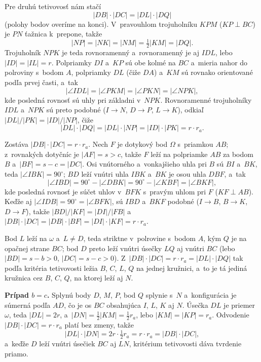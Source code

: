 {    Pre druhú tetivovosť nám stačí
    $$
    |DB| \cdot |DC| = |DL| \cdot |DQ|
    $$
    (polohy bodov overíme na konci). V~pravouhlom trojuholníku $KPM$ ($KP \perp BC$) je $PN$ ťažnica k~prepone, takže
    $$
    |NP| = |NK| = |NM| = \tfrac12|KM| = |DQ|.
    $$
    Trojuholník $NPK$ je teda rovnoramenný a~rovnoramenný je aj $IDL$, lebo $|ID| = |IL| = r$. Polpriamky $DI$ a~$KP$ sú obe kolmé na $BC$ a~mieria nahor do polroviny s~bodom $A$, polpriamky $DL$ (čiže $DA$) a~$KM$ sú rovnako orientované podľa prvej časti, a~tak
    $$
    |\angle IDL| = |\angle PKM| = |\angle PKN| = |\angle NPK|,
    $$
    kde posledná rovnosť sú uhly pri základni v~$NPK$. Rovnoramenné trojuholníky $IDL$ a~$NPK$ sú preto podobné ($I \to N$, $D \to P$, $L \to K$), odkiaľ $|DL|/|PK| = |ID|/|NP|$, čiže
    $$
    |DL| \cdot |DQ| = |DL| \cdot |NP| = |ID| \cdot |PK| = r \cdot r_a.
    $$

    Zostáva $|DB| \cdot |DC| = r \cdot r_a$. Nech $F$ je dotykový bod $\Omega$ s~priamkou $AB$; z~rovnakých dotyčníc je $|AF| = s > c$, takže $F$ leží na polpriamke $AB$ za bodom $B$ a~$|BF| = s-c = |DC|$. Osi vnútorného a~vonkajšieho uhla pri $B$ sú $BI$ a~$BK$, teda $|\angle IBK| = 90^\circ$; $BD$ leží vnútri uhla $IBK$ a~$BK$ je osou uhla $DBF$, a~tak
    $$
    |\angle IBD| = 90^\circ - |\angle DBK| = 90^\circ - |\angle KBF| = |\angle BKF|,
    $$
    kde posledná rovnosť je súčet uhlov v~$BFK$ s~pravým uhlom pri $F$ ($KF \perp AB$). Keďže aj $|\angle IDB| = 90^\circ = |\angle BFK|$, sú $IBD$ a~$BKF$ podobné ($I \to B$, $B \to K$, $D \to F$), takže $|BD|/|KF| = |DI|/|FB|$ a~$|DB| \cdot |DC| = |DB| \cdot |BF| = |DI| \cdot |KF| = r \cdot r_a$.

    Bod $L$ leží na $\omega$ a~$L \neq D$, teda striktne v~polrovine s~bodom $A$, kým $Q$ je na opačnej strane $BC$; bod $D$ preto leží vnútri úsečky $LQ$ aj vnútri $BC$ (lebo $|BD| = s-b > 0$, $|DC| = s-c > 0$). Z~$|DB| \cdot |DC| = r \cdot r_a = |DL| \cdot |DQ|$ tak podľa kritéria tetivovosti ležia $B$, $C$, $L$, $Q$ na jednej kružnici, a~to je tá jediná kružnica cez $B$, $C$, $Q$, na ktorej leží aj $N$.

    \textbf{Prípad $b=c$.} Splynú body $D$, $M$, $P$, bod $Q$ splynie s~$N$ a~konfigurácia je súmerná podľa $AD$, čo je os $BC$ obsahujúca $I$, $L$, $K$ aj $N$. Úsečka $DL$ je priemer $\omega$, teda $|DL| = 2r$, a~$|DN| = \tfrac12|KM| = \tfrac12 r_a$, lebo $|KM| = |KP| = r_a$. Odvodenie $|DB| \cdot |DC| = r \cdot r_a$ platí bez zmeny, takže
    $$
    |DL| \cdot |DN| = 2r \cdot \tfrac12 r_a = r \cdot r_a = |DB| \cdot |DC|,
    $$
    a~keďže $D$ leží vnútri úsečiek $BC$ aj $LN$, kritérium tetivovosti dáva tvrdenie priamo.
}

